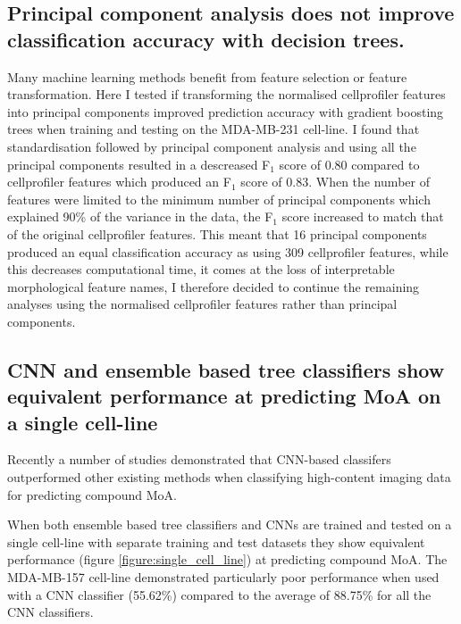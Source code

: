 \documentclass[a4paper,11pt,twoside,openright]{scrbook}
\begin{document}

\subsection{Principal component analysis does not improve classification accuracy with decision trees.}
Many machine learning methods benefit from feature selection or feature transformation.
Here I tested if transforming the normalised cellprofiler features into principal components improved prediction accuracy with gradient boosting trees when training and testing on the MDA-MB-231 cell-line.
I found that standardisation followed by principal component analysis and using all the principal components resulted in a descreased F$_1$ score of 0.80 compared to cellprofiler features which produced an F$_1$ score of 0.83.
When the number of features were limited to the minimum number of principal components which explained 90\% of the variance in the data, the F$_1$ score increased to match that of the original cellprofiler features.
This meant that 16 principal components produced an equal classification accuracy as using 309 cellprofiler features, while this decreases computational time, it comes at the loss of interpretable morphological feature names, I therefore decided to continue the remaining analyses using the normalised cellprofiler features rather than principal components.


\subsection{CNN and ensemble based tree classifiers show equivalent performance at predicting MoA on a single cell-line}

Recently a number of studies demonstrated that CNN-based classifers outperformed other existing methods when classifying high-content imaging data for predicting compound MoA.

When both ensemble based tree classifiers and CNNs are trained and tested on a single cell-line with separate training and test datasets they show equivalent performance (figure \ref{figure:single_cell_line}) at predicting compound MoA.
The MDA-MB-157 cell-line demonstrated particularly poor performance when used with a CNN classifier (55.62\%) compared to the average of 88.75\% for all the CNN classifiers.
\end{document}
